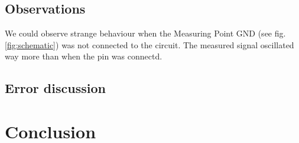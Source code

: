 \documentclass[a4paper,11pt]{article}
\begin{document}
\subsection{Observations}
We could observe strange behaviour when the Measuring Point GND (see fig. \ref{fig:schematic}) was not connected to the circuit. The measured signal oscillated way more than when the pin was connectd.


\subsection{Error discussion}

    \item 
\begin{itemize}

\end{itemize}

\section{Conclusion}



\end{document}
